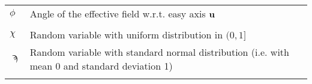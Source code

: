 \begin{longtable}[l]{p{60pt} p{350pt}}


	$\phi$ & Angle of the effective field w.r.t. easy axis $\boldsymbol{\mathbf{u}}$ \\
	&\\

	$\chi$ & Random variable with uniform distribution in $(0, 1]$ \\
	$\sampi$ & Random variable with standard normal distribution (i.e. with mean 0 and standard deviation 1) \\
	&\\
\end{longtable}
